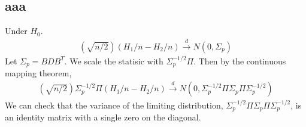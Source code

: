 \documentclass[11pt]{article} %
\begin{document}
\subsection{aaa}
Under $H_0$. 
\begin{align*}
	(\sqrt{n/2})(H_1/n - H_2/n)
	\stackrel{d}{\to}
	N(0,\Sigma_p)
\end{align*}
Let $\Sigma_p= BDB^T$. We scale the statisic with
$\Sigma_p^{-1/2} \Pi$.
Then by the continuous mapping theorem,
\begin{align*}
	(\sqrt{n/2})
	\Sigma_p^{-1/2} \Pi
	(H_1/n - H_2/n)
	\stackrel{d}{\to}
	N(0, \Sigma_p^{-1/2} \Pi \Sigma_p  \Pi \Sigma_p^{-1/2})
\end{align*}
We can check that the variance of the limiting distribution, $\Sigma_p^{-1/2} \Pi \Sigma_p  \Pi \Sigma_p^{-1/2}$, is an identity matrix with a single zero on the diagonal.


\end{document}

